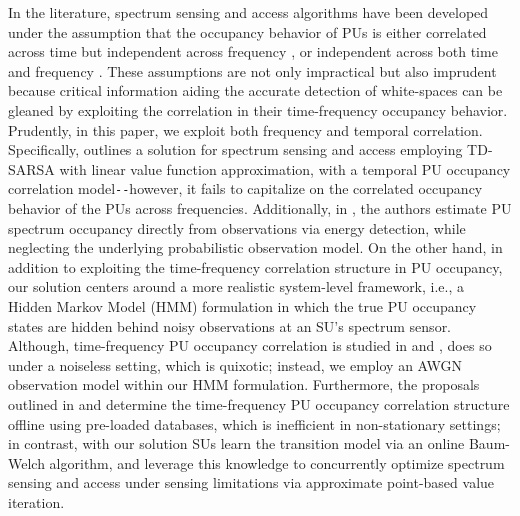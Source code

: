 \documentclass[12pt, draftcls, onecolumn]{IEEEtran}
\begin{document}
 In the literature, spectrum sensing and access algorithms have been developed under the assumption that the occupancy behavior of PUs is either correlated across time but independent across frequency \cite{WCL:5, WCL:6}, or independent across both time and frequency \cite{WCL:4, WCL:9, WCL:10, WCL:8, WCL:3, WCL:11, WCL:MIT}.
These assumptions are not only impractical but also imprudent because critical information aiding the accurate detection of white-spaces can be gleaned by exploiting the correlation in their time-frequency occupancy behavior. Prudently, in this paper, we exploit both frequency and temporal correlation. Specifically, \cite{WCL:5} outlines a solution for spectrum sensing and access employing TD-SARSA with linear value function approximation, with a temporal PU occupancy correlation model\texttt{-{}-}however, it fails to capitalize on the correlated occupancy behavior of the PUs across frequencies. Additionally, in \cite{WCL:5}, the authors estimate PU spectrum occupancy directly from observations via energy detection, while neglecting the underlying probabilistic observation model. On the other hand, in addition to exploiting the time-frequency correlation structure in PU occupancy, our solution centers around a more realistic system-level framework, i.e., a Hidden Markov Model (HMM) formulation in which the true PU occupancy states are hidden behind noisy observations at an SU's spectrum sensor. Although, time-frequency PU occupancy correlation is studied in \cite{WCL:6} and \cite{WCL:7}, \cite{WCL:7} does so under a noiseless setting, which is quixotic; instead, we employ an AWGN observation model within our HMM formulation. Furthermore, the proposals outlined in \cite{WCL:6} and \cite{WCL:7} determine the time-frequency PU occupancy correlation structure offline using pre-loaded databases, which is inefficient in non-stationary settings;
in contrast, with our solution  SUs learn the transition model via an online Baum-Welch algorithm, and leverage this knowledge to concurrently optimize spectrum sensing and access under sensing limitations via approximate point-based value iteration.
\end{document}
